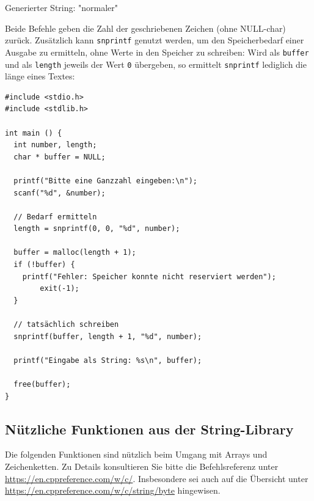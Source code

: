 \begin{cmdbox}
Generierter String: "normaler"
\end{cmdbox}

Beide Befehle geben die Zahl der geschriebenen Zeichen (ohne NULL-char) zurück. Zusätzlich kann \texttt{snprintf} genutzt werden, um den Speicherbedarf einer Ausgabe zu ermitteln, ohne Werte in den Speicher zu schreiben: Wird als \texttt{buffer} und als \texttt{length} jeweils der Wert \texttt{0} übergeben, so ermittelt \texttt{snprintf} lediglich die länge eines Textes:

\begin{codebox}
\begin{verbatim}
#include <stdio.h>
#include <stdlib.h>

int main () {
  int number, length;
  char * buffer = NULL;
  
  printf("Bitte eine Ganzzahl eingeben:\n");
  scanf("%d", &number);
  
  // Bedarf ermitteln
  length = snprintf(0, 0, "%d", number);
  
  buffer = malloc(length + 1);
  if (!buffer) {
    printf("Fehler: Speicher konnte nicht reserviert werden");
    	exit(-1);
  }

  // tatsächlich schreiben
  snprintf(buffer, length + 1, "%d", number);
  
  printf("Eingabe als String: %s\n", buffer);
  
  free(buffer);
}
\end{verbatim}
\end{codebox}

\subsection{Nützliche Funktionen aus der String-Library}
Die folgenden Funktionen sind nützlich beim Umgang mit Arrays und Zeichenketten. Zu Details konsultieren Sie bitte die Befehlsreferenz unter \url{https://en.cppreference.com/w/c/}. Insbesondere sei auch auf die Übersicht unter \url{https://en.cppreference.com/w/c/string/byte} hingewisen.

